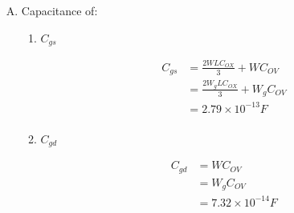 \documentclass{article}
\begin{document}
\begin{enumerate}[A.]
\item Capacitance of:
\begin{enumerate}[1.]
\item \(C_{gs}\)

\begin{equation*}
\begin{aligned}
C_{gs} &= \frac{2WLC_{OX}}{3} + WC_{OV} \\
&= \frac{2W_{g}LC_{OX}}{3} + W_{g}C_{OV} \\
&= 2.79 \times 10^{-13} F \\

\end{aligned}
\end{equation*}

\item \(C_{gd}\)

\begin{equation*}
\begin{aligned}
C_{gd} &= WC_{OV} \\
&= W_{g}C_{OV} \\
&= 7.32 \times 10^{-14} F \\
\end{aligned}
\end{equation*}
\end{enumerate}
\end{enumerate}
\end{document}
